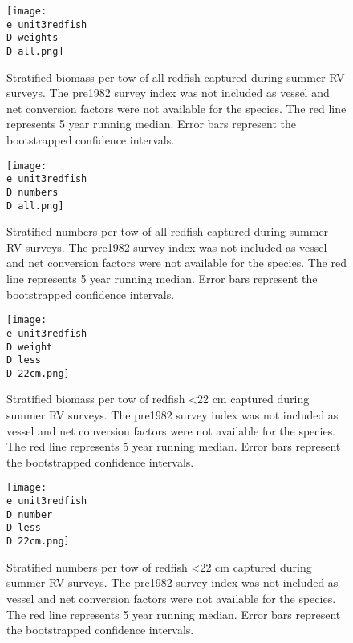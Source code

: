 \documentclass[11pt]{article}
\newcommand{\D}{.}
\newcommand{\e}{/home/ecomod_data/redfish/figures/}
\begin{document}
\begin{figure}
\centering
    
    \texttt{[image: \\e unit3redfish\\D weights\\D all.png]}
    \caption{Stratified biomass per tow of all redfish captured during summer RV surveys. The pre1982 survey index was not included as vessel and net conversion factors were not available for the species. The red line represents 5 year running median. Error bars represent the bootstrapped confidence intervals.}

\end{figure}
\clearpage

\begin{figure}
\centering
    
    \texttt{[image: \\e unit3redfish\\D numbers\\D all.png]}
    \caption{Stratified numbers per tow of all redfish captured during summer RV surveys. The pre1982 survey index was not included as vessel and net conversion factors were not available for the species. The red line represents 5 year running median. Error bars represent the bootstrapped confidence intervals.}

\end{figure}
\clearpage

\begin{figure}
\centering
    
    \texttt{[image: \\e unit3redfish\\D weight\\D less\\D 22cm.png]}
    \caption{Stratified biomass per tow of redfish \textless 22 cm captured during summer RV surveys. The pre1982 survey index was not included as vessel and net conversion factors were not available for the species. The red line represents 5 year running median. Error bars represent the bootstrapped confidence intervals.}

\end{figure}
%
%
\begin{figure}
\centering
    
    \texttt{[image: \\e unit3redfish\\D number\\D less\\D 22cm.png]}
    \caption{Stratified numbers per tow of redfish \textless 22 cm  captured during summer RV surveys. The pre1982 survey index was not included as vessel and net conversion factors were not available for the species. The red line represents 5 year running median. Error bars represent the bootstrapped confidence intervals.}

\end{figure}
\clearpage
\end{document}
